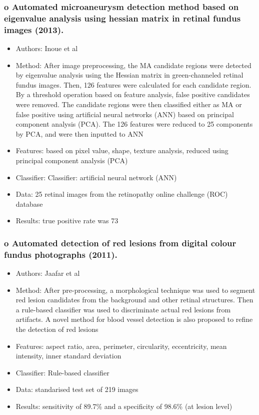 \documentclass[12pt]{report}
\begin{document}
\subsubsection{o   Automated microaneurysm detection method based on eigenvalue analysis using hessian matrix in retinal fundus images (2013). \cite{inoue2013automated}}
\begin{itemize}
\item Authors: Inoue et al
\item Method: After image preprocessing, the MA candidate regions were detected by eigenvalue analysis using the Hessian matrix in green-channeled retinal fundus images. Then, 126 features were calculated for each candidate region. By a threshold operation based on feature analysis, false positive candidates were removed. The candidate regions were then classified either as MA or false positive using artificial neural networks (ANN) based on principal component analysis (PCA). The 126 features were reduced to 25 components by PCA, and were then inputted to ANN
\item Features: based on pixel value, shape, texture analysis, reduced using principal component analysis (PCA)
\item Classifier: Classifier: artificial neural network (ANN)
\item Data: 25 retinal images from the retinopathy online challenge (ROC) database
\item Results: true positive rate was 73%
\end{itemize}

\subsubsection{o  Automated detection of red lesions from digital colour fundus photographs (2011). \cite{jaafar2011automated}}
\begin{itemize}
\item Authors: Jaafar et al
\item Method: After pre-processing, a morphological technique was used to segment red lesion candidates from the background and other retinal structures. Then a rule-based classifier was used to discriminate actual red lesions from artifacts. A novel method for blood vessel detection is also proposed to refine the detection of red lesions
\item Features: aspect ratio, area, perimeter, circularity, eccentricity, mean intensity, inner standard deviation
\item Classifier: Rule-based classifier
\item Data: standarised test set of 219 images
\item Results: sensitivity of 89.7\% and a specificity of 98.6\% (at lesion level)
\end{itemize}
\end{document}
